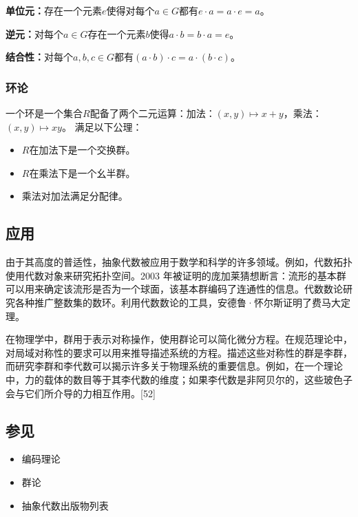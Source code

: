 \textbf{单位元：}存在一个元素$e$使得对每个$a \in G$都有$e \cdot a = a \cdot e = a$。  

\textbf{逆元：}对每个$a \in G$存在一个元素$b$使得$a \cdot b = b \cdot a = e$。  

\textbf{结合性：}对每个$a,b,c \in G$都有$(a \cdot b) \cdot c = a \cdot (b \cdot c)$。  
\subsubsection{环论}
一个环是一个集合$R$配备了两个二元运算：加法：$(x,y) \mapsto x + y$，乘法：$(x,y) \mapsto xy$。
满足以下公理：
\begin{itemize}
\item $R$在加法下是一个交换群。  
\item $R$在乘法下是一个幺半群。  
\item 乘法对加法满足分配律。
\end{itemize}
\subsection{应用}
由于其高度的普适性，抽象代数被应用于数学和科学的许多领域。例如，代数拓扑使用代数对象来研究拓扑空间。2003 年被证明的庞加莱猜想断言：流形的基本群可以用来确定该流形是否为一个球面，该基本群编码了连通性的信息。代数数论研究各种推广整数集的数环。利用代数数论的工具，安德鲁·怀尔斯证明了费马大定理。

在物理学中，群用于表示对称操作，使用群论可以简化微分方程。在规范理论中，对局域对称性的要求可以用来推导描述系统的方程。描述这些对称性的群是李群，而研究李群和李代数可以揭示许多关于物理系统的重要信息。例如，在一个理论中，力的载体的数目等于其李代数的维度；如果李代数是非阿贝尔的，这些玻色子会与它们所介导的力相互作用。[52]
\subsection{参见}
\begin{itemize}
\item 编码理论
\item 群论
\item 抽象代数出版物列表
\end{itemize}
